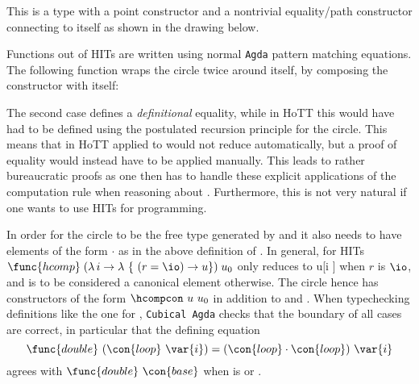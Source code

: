 This is a type with a point constructor  and a nontrivial
equality/path constructor  connecting  to itself
as shown in the drawing below.

\begin{center}
\end{center}

Functions out of HITs are written using normal \texttt{Agda} pattern
matching equations. The following function wraps the circle twice
around itself, by composing the  constructor with itself:
%

The second case defines a \emph{definitional} equality, while in HoTT
this would have had to be defined using the postulated recursion
principle for the circle. This means that in HoTT 
applied to  would not reduce automatically, but a
proof of equality would instead have to be applied
manually. This leads to rather bureaucratic proofs as one then has to
handle these explicit applications of the computation rule when
reasoning about . Furthermore, this is not very natural
if one wants to use HITs for programming.

In order for the circle to be the free type generated by 
and  it also needs to have elements of the form 
$\cdot$  as in the above definition of . In
general, for HITs
$\func{hcomp}\;(\lambda\,i\to\lambda~\{~(r = \io) \to u\})\;u_0$ only
reduces to u[\substnop i {\io}] when $r$ is $\io$, and is to be
considered a canonical element otherwise. The circle hence has
constructors of the form $\hcompcon~u~u_0$ in addition to 
and . When typechecking definitions like the one for
, \texttt{Cubical Agda} checks that the boundary of all
cases are correct, in particular that the defining equation
\[
  \func{double}~(\con{loop}~\var{i}) = (\con{loop} \cdot \con{loop})~\var{i}
\]
agrees with \( \func{double}\ \con{base} \) when  is \iz{} or
\io{}.


